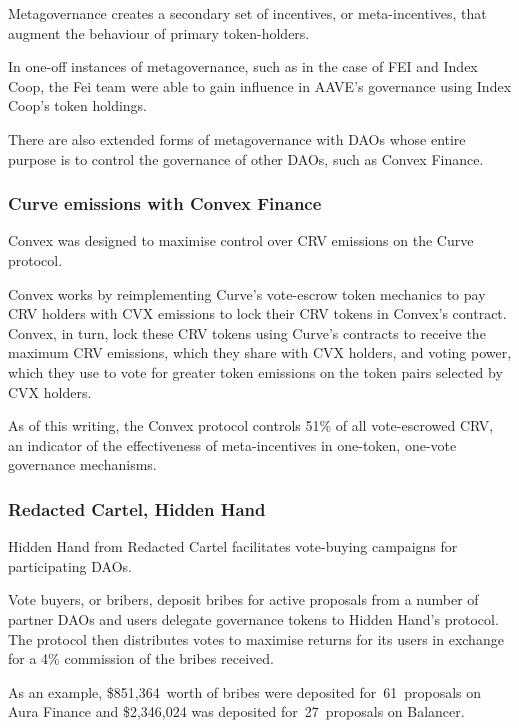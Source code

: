 \documentclass[
]{article}
\begin{document}
Metagovernance creates a secondary set of incentives, or
meta-incentives, that augment the behaviour of primary token-holders.

In one-off instances of metagovernance, such as in the case of FEI and
Index Coop, the Fei team were able to gain influence in AAVE's
governance using Index Coop's token holdings.

There are also extended forms of metagovernance with DAOs whose entire
purpose is to control the governance of other DAOs, such as Convex
Finance.

\hypertarget{curve-emissions-with-convex-finance}{%
\subsubsection{Curve emissions with Convex
Finance}\label{curve-emissions-with-convex-finance}}

Convex was designed to maximise control over CRV emissions on the Curve
protocol.

Convex works by reimplementing Curve's vote-escrow token mechanics to
pay CRV holders with CVX emissions to lock their CRV tokens in Convex's
contract. Convex, in turn, lock these CRV tokens using Curve's contracts
to receive the maximum CRV emissions, which they share with CVX holders,
and voting power, which they use to vote for greater token emissions on
the token pairs selected by CVX holders.

As of this writing, the Convex protocol controls 51\% of all
vote-escrowed CRV, an indicator of the effectiveness of meta-incentives
in one-token, one-vote governance mechanisms.

\hypertarget{redacted-cartel-hidden-hand}{%
\subsubsection{Redacted Cartel, Hidden
Hand}\label{redacted-cartel-hidden-hand}}

Hidden Hand from Redacted Cartel facilitates vote-buying campaigns for
participating DAOs.

Vote buyers, or bribers, deposit bribes for active proposals from a
number of partner DAOs and users delegate governance tokens to Hidden
Hand's protocol. The protocol then distributes votes to maximise returns
for its users in exchange for a 4\% commission of the bribes received.

As an example, \$851,364~worth of bribes were deposited for~61~proposals
on Aura Finance and \$2,346,024 was deposited for~27~proposals on
Balancer.
\end{document}
